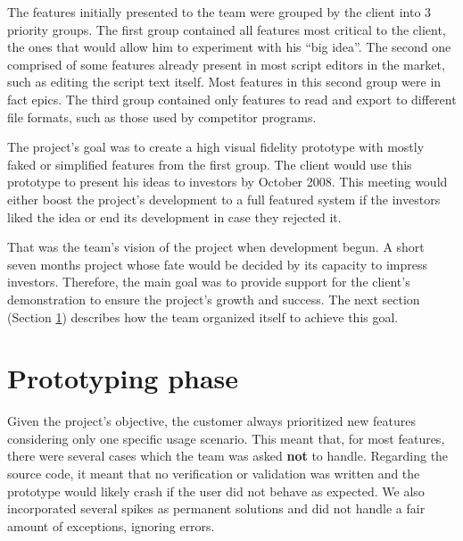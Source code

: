 \documentclass[lnbip]{svmultln}
\begin{document}

The features initially presented to the team were grouped by the
client into 3 priority groups. The first group contained all features
most critical to the client, the ones that would allow him to
experiment with his ``big idea''. The second one comprised of some
features already present in most script editors in the market, such as
editing the script text itself. Most features in this second group
were in fact epics. The third group contained only features to read
and export to different file formats, such as those used by competitor
programs.

The project's goal was to create a high visual fidelity prototype with
mostly faked or simplified features from the first group. The client
would use this prototype to present his ideas to investors by October
2008. This meeting would either boost the project's development to a
full featured system if the investors liked the idea or end its
development in case they rejected it.

That was the team's vision of the project when development
begun. A short seven months project whose fate would be decided by its
capacity to impress investors. Therefore, the main goal was to provide
support for the client's demonstration to ensure the project's growth
and success. The next section (Section \ref{sec:working}) describes
how the team organized itself to achieve this goal.

\section{Prototyping phase}
\label{sec:working}

Given the project's objective, the customer always prioritized new
features considering only one specific usage scenario. This meant
that, for most features, there were several cases which the team was
asked \textbf{not} to handle. Regarding the source code, it meant that
no verification or validation was written and the prototype would likely
crash if the user did not behave as expected. We also incorporated
several spikes as permanent solutions and did not handle a fair amount
of exceptions, ignoring errors.
\end{document}
